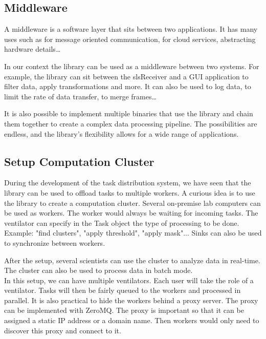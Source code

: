 \begin{spacing}{1.2}
    \subsection{Middleware}

    A middleware is a software layer that sits between two applications. It has many uses such as
    for message oriented communication, for cloud services, abstracting hardware details\dots

    In our context the library can be used as a middleware between two systems. For example,
    the library can sit between the slsReceiver and a GUI application to filter data, apply transformations
    and more. It can also be used to log data, to limit the rate of data transfer, to merge frames\dots

    It is also possible to implement multiple binaries that use the library and chain them together
    to create a complex data processing pipeline. The possibilities are endless, and the library's
    flexibility allows for a wide range of applications.


    \subsection{Setup Computation Cluster}
    During the development of the task distribution system, we have seen that the library can be used
    to offload tasks to multiple workers. A curious idea is to use the library to create a computation
    cluster. Several on-premise lab computers can be used as workers. The worker would always be waiting
    for incoming tasks. The ventilator can specify in the Task object the type of processing to be done.
    Example: "find clusters", "apply threshold", "apply mask"... Sinks can also be used to synchronize
    between workers.

    After the setup, several scientists can use the cluster to analyze data in real-time.
    The cluster can also be used to process data in batch mode.\\

    In this setup, we can have multiple ventilators. Each user will take the role of a ventilator.
    Tasks will then be fairly queued to the workers and processed in parallel. It is also
    practical to hide the workers behind a proxy server. The proxy can be implemented
    with ZeroMQ. The proxy is important so that it can be assigned a static IP address or a
    domain name. Then workers would only need to discover this proxy and connect to it.







\end{spacing}
